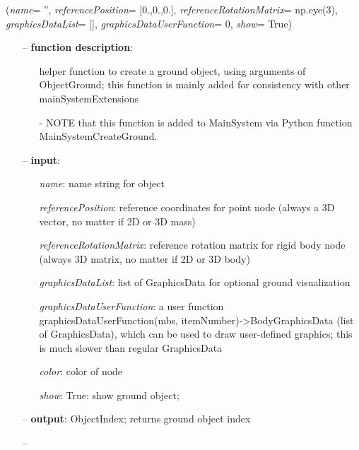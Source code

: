 \begin{flushleft}
\label{sec:mainsystemextensions:CreateGround}
({\it name}= '', {\it referencePosition}= [0.,0.,0.], {\it referenceRotationMatrix}= np.eye(3), {\it graphicsDataList}= [], {\it graphicsDataUserFunction}= 0, {\it show}= True)
\end{flushleft}
\setlength{\itemindent}{0.7cm}
\begin{itemize}[leftmargin=0.7cm]
\item[--]
{\bf function description}: \vspace{-6pt}
\begin{itemize}[leftmargin=1.2cm]
\setlength{\itemindent}{-0.7cm}
\item[]helper function to create a ground object, using arguments of ObjectGround; this function is mainly added for consistency with other mainSystemExtensions
\item[]- NOTE that this function is added to MainSystem via Python function MainSystemCreateGround.
\end{itemize}
\item[--]
{\bf input}: \vspace{-6pt}
\begin{itemize}[leftmargin=1.2cm]
\setlength{\itemindent}{-0.7cm}
\item[]{\it name}: name string for object
\item[]{\it referencePosition}: reference coordinates for point node (always a 3D vector, no matter if 2D or 3D mass)
\item[]{\it referenceRotationMatrix}: reference rotation matrix for rigid body node (always 3D matrix, no matter if 2D or 3D body)
\item[]{\it graphicsDataList}: list of GraphicsData for optional ground visualization
\item[]{\it graphicsDataUserFunction}: a user function graphicsDataUserFunction(mbs, itemNumber)->BodyGraphicsData (list of GraphicsData), which can be used to draw user-defined graphics; this is much slower than regular GraphicsData
\item[]{\it color}: color of node
\item[]{\it show}: True: show ground object;
\end{itemize}
\item[--]
{\bf output}: ObjectIndex; returns ground object index
\item[--]

\end{itemize}
